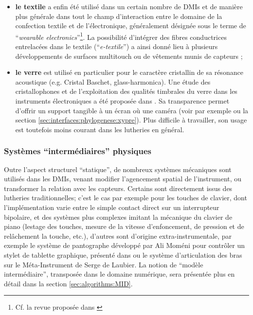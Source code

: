 \begin{itemize}[noitemsep]
	\item \textbf{le textile} a enfin été utilisé dans un certain nombre de \glspl{DMI} et de manière plus générale dans tout le champ d'interaction entre le domaine de la confection textile et de l'électronique, généralement désignée sous le terme de ``\textit{wearable electronics}''\footnote{Cf. la revue proposée dans \cite{stoppa_wearable_2014}}. La possibilité d'intégrer des fibres conductrices entrelacées dans le textile (``\textit{e-textile}'') a ainsi donné lieu à plusieurs développements de surfaces multitouch \cite{freed_application_2008, donneaud_designing_2017, wicaksono_fabrickeyboard:_2017} ou de vêtements munis de capteurs \cite{hayafuchi_musicglove_2008, serafin_controlling_2014, myllykoski_prototyping_2015};

	\item \textbf{le verre} est utilisé en particulier pour le caractère cristallin de sa résonance acoustique (e.g. Cristal Baschet, glass-harmonica). Une étude des cristallophones et de l'exploitation des qualités timbrales du verre dans les instruments électroniques a été proposée dans \cite{jensenius_evaluating_2010, frounberg_glass_2010}. Sa transparence permet d'offrir un support tangible à un écran où une caméra (voir par exemple \cite{savary_dirti_2012} ou la section \ref{sec:interfaces:phylogenese:xypre}). Plus difficile à travailler, son usage est toutefois moins courant dans les lutheries en général.
\end{itemize}

\subsubsection{Systèmes ``intermédiaires'' physiques}

\noindent Outre l'aspect structurel ``statique'', de nombreux systèmes mécaniques sont utilisés dans les \glspl{DMI}, venant modifier l'agencement spatial de l'instrument, ou transformer la relation avec les capteurs. Certains sont directement issus des lutheries traditionnelles; c'est le cas par exemple pour les touches de clavier, dont l'implémentation varie entre le simple contact direct sur un interrupteur bipolaire, et des systèmes plus complexes imitant la mécanique du clavier de piano (lestage des touches, mesure de la vitesse d'enfoncement, de pression et de relâchement la touche, etc.), d'autres sont d'origine extra-instrumentale, par exemple le système de pantographe développé par Ali Moméni pour contrôler un stylet de tablette graphique, présenté dans \cite{zbyszynski_ten_2007} ou le système d'articulation des bras sur le Méta-Instrument de Serge de Laubier. La notion de ``modèle intermédiaire'', transposée dans le domaine numérique, sera présentée plus en détail dans la section \ref{sec:algorithms:MID}.

